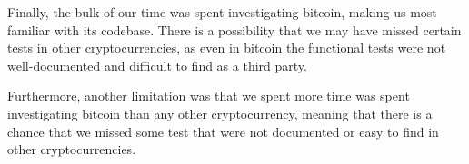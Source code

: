 Finally, the bulk of our time was spent investigating bitcoin, making us most
familiar with its codebase. There is a possibility that we may have missed
certain tests in other cryptocurrencies, as even in bitcoin the functional tests
were not well-documented and difficult to find as a third party.

Furthermore, another limitation was that we spent more time was spent investigating bitcoin than any other cryptocurrency, meaning that there is a chance that we missed
some test that were not documented or easy to find in other cryptocurrencies.
\fi

